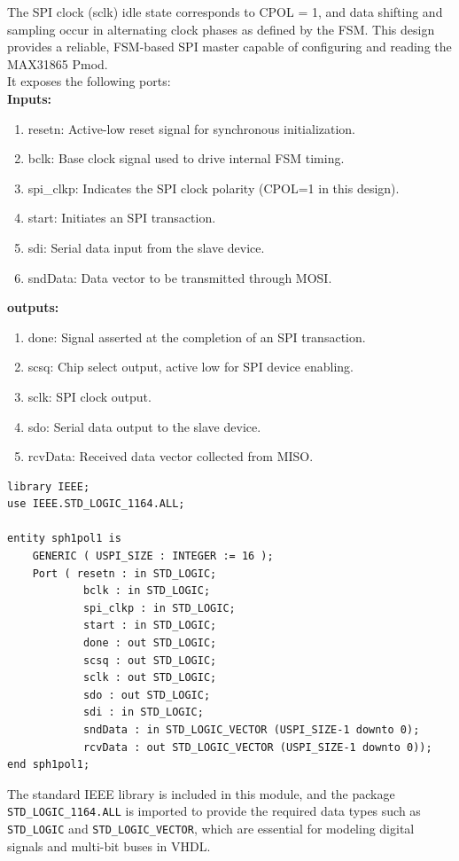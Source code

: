 The SPI clock (sclk) idle state corresponds to CPOL = 1, and data shifting and sampling occur in alternating clock phases as defined by the FSM. This design provides a reliable, FSM-based SPI master capable of configuring and reading the MAX31865 Pmod.\\
It exposes the following ports:\\
\textbf{Inputs:}
\begin{enumerate}
\item resetn: Active-low reset signal for synchronous initialization.
\item bclk: Base clock signal used to drive internal FSM timing.
\item spi\_clkp: Indicates the SPI clock polarity (CPOL=1 in this design).
\item start: Initiates an SPI transaction.
\item sdi: Serial data input from the slave device.
\item sndData: Data vector to be transmitted through MOSI.
\end{enumerate}
\textbf{outputs:}
\begin{enumerate}
\item done: Signal asserted at the completion of an SPI transaction.
\item scsq: Chip select output, active low for SPI device enabling.
\item sclk: SPI clock output.
\item sdo: Serial data output to the slave device.
\item rcvData: Received data vector collected from MISO.
\end{enumerate}

\begin{verbatim}
library IEEE;
use IEEE.STD_LOGIC_1164.ALL;

entity sph1pol1 is
    GENERIC ( USPI_SIZE : INTEGER := 16 );
    Port ( resetn : in STD_LOGIC;
            bclk : in STD_LOGIC;
            spi_clkp : in STD_LOGIC;
            start : in STD_LOGIC;
            done : out STD_LOGIC;
            scsq : out STD_LOGIC;
            sclk : out STD_LOGIC;
            sdo : out STD_LOGIC;
            sdi : in STD_LOGIC;
            sndData : in STD_LOGIC_VECTOR (USPI_SIZE-1 downto 0);
            rcvData : out STD_LOGIC_VECTOR (USPI_SIZE-1 downto 0));
end sph1pol1;
\end{verbatim}

The standard IEEE library is included in this module, and the package \texttt{STD\_LOGIC\_1164.ALL} is imported to provide the required data types such as \texttt{STD\_LOGIC} and \texttt{STD\_LOGIC\_VECTOR}, which are essential for modeling digital signals and multi-bit buses in VHDL.


